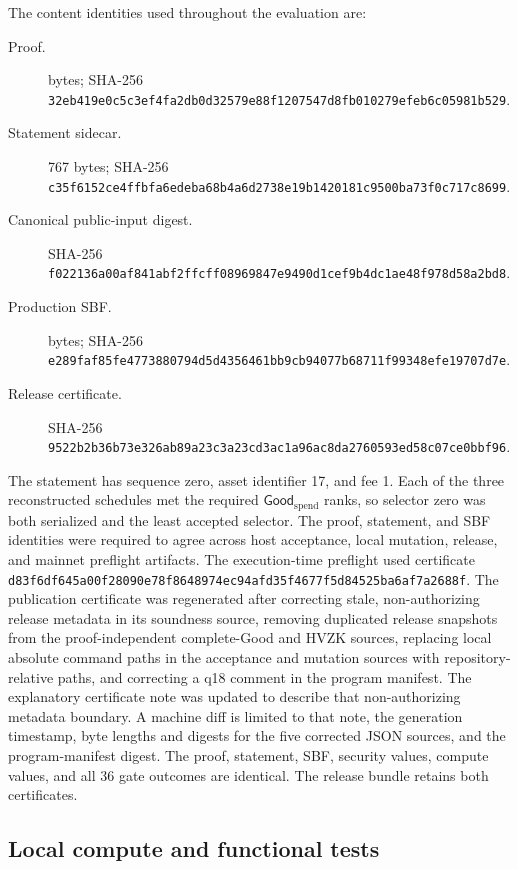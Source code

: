 The content identities used throughout the evaluation are:
\begin{description}
  \item[Proof.] \ProfileProofBytes{} bytes; SHA-256
  \nolinkurl{32eb419e0c5c3ef4fa2db0d32579e88f1207547d8fb010279efeb6c05981b529}.
  \item[Statement sidecar.] 767 bytes; SHA-256
  \nolinkurl{c35f6152ce4ffbfa6edeba68b4a6d2738e19b1420181c9500ba73f0c717c8699}.
  \item[Canonical public-input digest.] SHA-256
  \nolinkurl{f022136a00af841abf2ffcff08969847e9490d1cef9b4dc1ae48f978d58a2bd8}.
  \item[Production SBF.] \ProfileSbfBytes{} bytes; SHA-256
  \nolinkurl{e289faf85fe4773880794d5d4356461bb9cb94077b68711f99348efe19707d7e}.
  \item[Release certificate.] SHA-256
  \nolinkurl{9522b2b36b73e326ab89a23c3a23cd3ac1a96ac8da2760593ed58c07ce0bbf96}.
\end{description}

The statement has sequence zero, asset identifier 17, and fee 1.  Each of the
three reconstructed schedules met the required $\mathsf{Good}_{\mathrm{spend}}$ ranks,
so selector zero was both serialized and the least accepted selector.  The
proof, statement, and SBF identities were required to agree across host
acceptance, local mutation, release, and mainnet preflight artifacts.
The execution-time preflight used certificate
\nolinkurl{d83f6df645a00f28090e78f8648974ec94afd35f4677f5d84525ba6af7a2688f}.
The publication certificate was regenerated after correcting stale,
non-authorizing release metadata in its soundness source, removing duplicated
release snapshots from the proof-independent complete-Good and HVZK sources,
replacing local absolute command paths in the acceptance and mutation sources
with repository-relative paths, and correcting a q18 comment in the program
manifest.  The explanatory certificate note was updated to describe that
non-authorizing metadata boundary.  A machine diff is limited to that note,
the generation timestamp, byte lengths and digests for the five corrected
JSON sources, and the program-manifest digest.  The proof, statement, SBF,
security values, compute values, and all 36 gate outcomes are identical.  The
release bundle retains both certificates.

\subsection{Local compute and functional tests}
\label{sec:evaluation-local}

